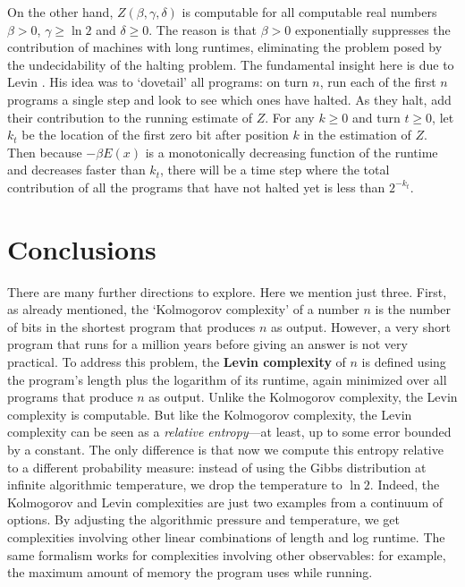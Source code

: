 \documentclass[12pt,twoside,openright]{report}
\begin{document}
On the other hand, $Z(\beta,\gamma,\delta)$ is computable for all computable real numbers $\beta > 0$, $\gamma \ge \ln 2$ and 
$\delta \ge 0$.   The reason is that $\beta > 0$ exponentially suppresses the contribution of machines with long runtimes, eliminating the problem posed by the undecidability of the halting problem.  The fundamental insight here is due to Levin \cite{Levin1973}.  His idea was to `dovetail' all programs: on turn $n$, run each of the first $n$ programs a single step and look to see which ones have halted.  As they halt, add their contribution to the running estimate of $Z$. For any $k\ge 0$ and turn $t\ge 0$, let $k_t$ be the location of the first zero bit after position $k$ in the estimation of $Z$. Then because $-\beta E(x)$ is a monotonically decreasing function of the runtime and decreases faster than $k_t$, there will be a time step where the total contribution of all the programs that have not halted yet is less than $2^{-k_t}$.

\section{Conclusions}

There are many further directions to explore.  Here we mention just three.  First, as already mentioned, the `Kolmogorov complexity' 
\cite{Kolmogorov1965} of a number $n$ is the number of bits in the shortest program that produces $n$ as output. However, a very short program that runs for a million years before giving an answer is not very practical.  To address this problem, the \textbf{Levin complexity} \cite{Levin1974} of $n$ is defined using the program's length plus the logarithm of its runtime, again minimized over all programs that produce $n$ as output.  Unlike the Kolmogorov complexity, the Levin complexity is computable.  But like the Kolmogorov complexity, the Levin complexity can be seen as a \emph{relative entropy}---at least, up to some error bounded by a constant.   The only difference is that now we compute this entropy relative to a different probability measure: instead of using the Gibbs distribution at infinite algorithmic temperature, we drop the temperature to $\ln 2$.  Indeed, the Kolmogorov and Levin complexities are just two examples from a continuum of options. By adjusting the algorithmic pressure and temperature, we get complexities involving other linear combinations of length and log runtime.  The same formalism works for complexities involving other observables: for example, the maximum amount of memory the program uses while running.
\end{document}
